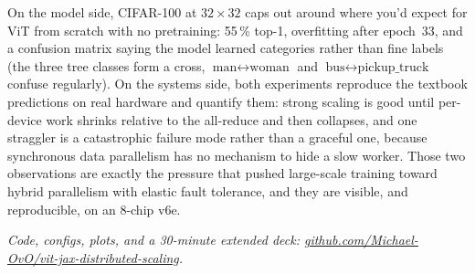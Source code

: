 \documentclass[11pt]{article}
\begin{document}
On the model side, CIFAR-100 at $32{\times}32$ caps out around where you'd expect for ViT
from scratch with no pretraining: 55\,\% top-1, overfitting after epoch~33, and a confusion
matrix saying the model learned categories rather than fine labels (the three tree classes
form a cross, $\textrm{man}\leftrightarrow\textrm{woman}$ and
$\textrm{bus}\leftrightarrow\textrm{pickup\_truck}$ confuse regularly). On the systems
side, both experiments reproduce the textbook predictions on real hardware and quantify
them: strong scaling is good until per-device work shrinks relative to the all-reduce and
then collapses, and one straggler is a catastrophic failure mode rather than a graceful
one, because synchronous data parallelism has no mechanism to hide a slow worker. Those
two observations are exactly the pressure that pushed large-scale training toward hybrid
parallelism with elastic fault tolerance, and they are visible, and reproducible, on an
8-chip v6e.

\vspace{0.15em}
\noindent\textit{\small Code, configs, plots, and a 30-minute extended deck: \href{https://github.com/Michael-OvO/vit-jax-distributed-scaling}{github.com/Michael-OvO/vit-jax-distributed-scaling}.}
\end{document}
